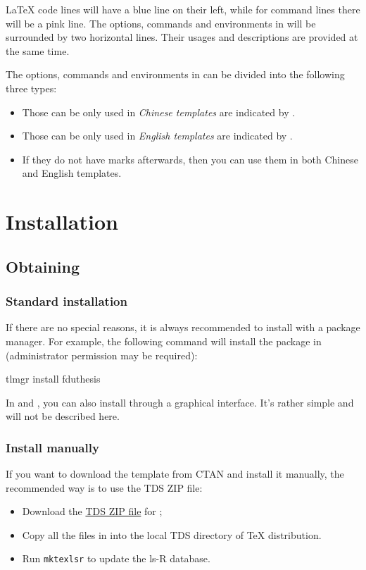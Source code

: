 \documentclass{fdudoc}
\begin{document}
\LaTeX{} code lines will have a blue line on their left, while
for command lines there will be a pink line. The options,
commands and environments in  will be surrounded
by two horizontal lines. Their usages and descriptions are
provided at the same time.

The options, commands and environments in  can be
divided into the following three types:
\begin{itemize}
  \item Those can be only used in \emph{Chinese templates} are
    indicated by \rexptarget\rexpstar{}.
  \item Those can be only used in \emph{English templates} are
    indicated by \rexptarget\expstar{}.
  \item If they do not have marks afterwards, then you can use
    them in both Chinese and English templates.
\end{itemize}

\section{Installation}

\subsection{Obtaining }

\subsubsection{Standard installation}

If there are no special reasons, it is always recommended to
install  with a package manager. For example,
the following command will install the package in \TeXLive{}
(administrator permission may be required):
\begin{shellexample}[gobble=1,morekeywords={tlmgr,install}]
  tlmgr install fduthesis
\end{shellexample}

In \TeXLive{} and \MiKTeX{}, you can also install 
through a graphical interface. It's rather simple and will not be
described here.

\subsubsection{Install manually}

If you want to download the template from CTAN and install it
manually, the recommended way is to use the TDS ZIP file:
\begin{itemize}
  \item Download the \href{http://mirror.ctan.org/install/macros/latex/contrib/fduthesis.tds.zip}%
    {TDS ZIP file} for ;
  \item Copy all the files in  into the
    local TDS directory of \TeX{} distribution.
  \item Run \texttt{mktexlsr} to update the ls-R database.
\end{itemize}
\end{document}
